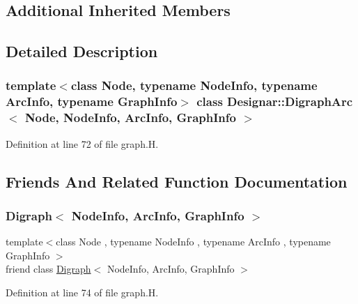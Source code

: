 \subsection*{Additional Inherited Members}


\subsection{Detailed Description}
\subsubsection*{template$<$class Node, typename Node\+Info, typename Arc\+Info, typename Graph\+Info$>$\newline
class Designar\+::\+Digraph\+Arc$<$ Node, Node\+Info, Arc\+Info, Graph\+Info $>$}



Definition at line 72 of file graph.\+H.



\subsection{Friends And Related Function Documentation}
\mbox{\label{class_designar_1_1_digraph_arc_abc8f370e4ec7084a6574cf967a5a5aaf}} 
\subsubsection{\texorpdfstring{Digraph$<$ Node\+Info, Arc\+Info, Graph\+Info $>$}{Digraph< NodeInfo, ArcInfo, GraphInfo >}}
{\footnotesize\ttfamily template$<$class Node , typename Node\+Info , typename Arc\+Info , typename Graph\+Info $>$ \\
friend class \hyperlink{class_designar_1_1_digraph}{Digraph}$<$ Node\+Info, Arc\+Info, Graph\+Info $>$\hspace{0.3cm}{\ttfamily [friend]}}



Definition at line 74 of file graph.\+H.

\mbox{\label{class_designar_1_1_digraph_arc_a1d0cecb0e630aa2aa8179b2afdd92a8b}} 
